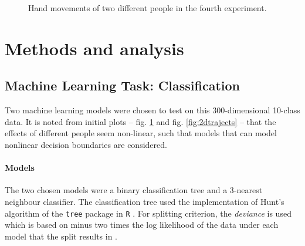 \documentclass[11pt,fleqn]{article}
\begin{document}
\begin{figure}[H]
	\centering
	\label{fig:trajects}
	\caption{Hand movements of two different people in the fourth experiment.}
\end{figure}


\section{Methods and analysis}


\subsection{Machine Learning Task: Classification}
Two machine learning models were chosen to test on this 300-dimensional 10-class data.
It is noted from initial plots -- fig. \ref{fig:trajects} and fig. \ref{fig:2dtrajects} -- that the effects of different people seem non-linear, such that models that can model nonlinear decision boundaries are considered.
\paragraph{Models} The two chosen models were a binary classification tree and a 3-nearest neighbour classifier. The classification tree used the implementation of Hunt's algorithm of the \texttt{tree} package in \texttt{R} \cite{Tree}. For splitting criterion, the \textit{deviance} is used which is based on minus two times the log likelihood of the data under each model that the split results in \cite{Deviance}.
\end{document}
